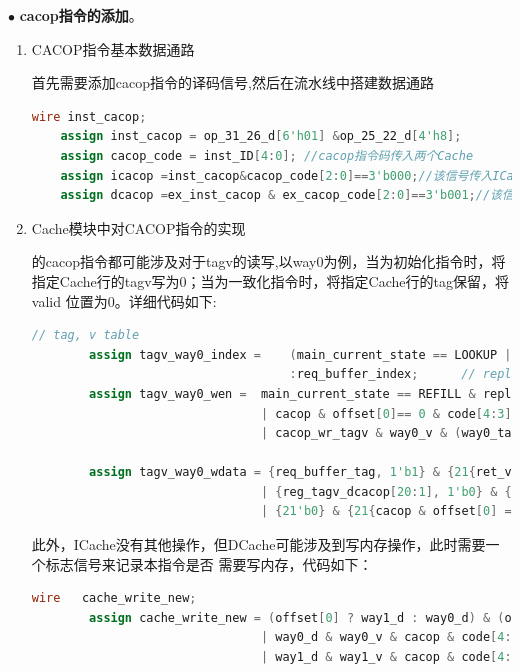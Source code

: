 \documentclass[11pt]{article}
\begin{document}
\noindent
$\bullet$
\textbf{cacop指令的添加}。
\begin{enumerate}
    \item CACOP指令基本数据通路
    
    首先需要添加cacop指令的译码信号,然后在流水线中搭建数据通路
    \begin{lstlisting}[language=verilog]
    wire inst_cacop;
    assign inst_cacop = op_31_26_d[6'h01] &op_25_22_d[4'h8];
    assign cacop_code = inst_ID[4:0]; //cacop指令码传入两个Cache
    assign icacop =inst_cacop&cacop_code[2:0]==3'b000;//该信号传入ICache
    assign dcacop =ex_inst_cacop & ex_cacop_code[2:0]==3'b001;//该信号传入DCache
    \end{lstlisting}
    \item Cache模块中对CACOP指令的实现
    
    的cacop指令都可能涉及对于tagv的读写,以way0为例，当为初始化指令时，将指定Cache行的tagv写为0；当为一致化指令时，将指定Cache行的tag保留，将valid
    位置为0。详细代码如下:
    \begin{lstlisting}[language=verilog]
        // tag, v table
        assign tagv_way0_index =    (main_current_state == LOOKUP || main_current_state == IDLE) ? index   // look up
                                    :req_buffer_index;      // replace and refill;
        assign tagv_way0_wen =  main_current_state == REFILL & replace_way == 0 & ret_valid & ret_last & req_buffer_type
                                | cacop & offset[0]== 0 & code[4:3] != 2'b10 
                                | cacop_wr_tagv & way0_v & (way0_tag == tag) & req_buffer_type & code[4:3]==2'b10;     
    
        assign tagv_way0_wdata = {req_buffer_tag, 1'b1} & {21{ret_valid & ret_last & replace_way == 0 & req_buffer_type}}
                                | {reg_tagv_dcacop[20:1], 1'b0} & {21{cacop & offset[0] == 0 & (code[4:3] == 2'b01 | code[4:3] == 2'b10)}}
                                | {21'b0} & {21{cacop & offset[0] == 0 & code[4:3] == 2'b00}};
    \end{lstlisting}

    此外，ICache没有其他操作，但DCache可能涉及到写内存操作，此时需要一个标志信号来记录本指令是否
需要写内存，代码如下：
    \begin{lstlisting}[language=verilog]
        wire   cache_write_new;
        assign cache_write_new = (offset[0] ? way1_d : way0_d) & (offset[0] ? {way1_tag,way1_v} : {way0_tag,way0_v} ) & cacop & code[4:3] == 2'b01
                                | way0_d & way0_v & cacop & code[4:3] == 2'b10 & way0_hit 
                                | way1_d & way1_v & cacop & code[4:3] == 2'b10 & way1_hit;
        

\end{lstlisting}
\end{enumerate}
\end{document}
